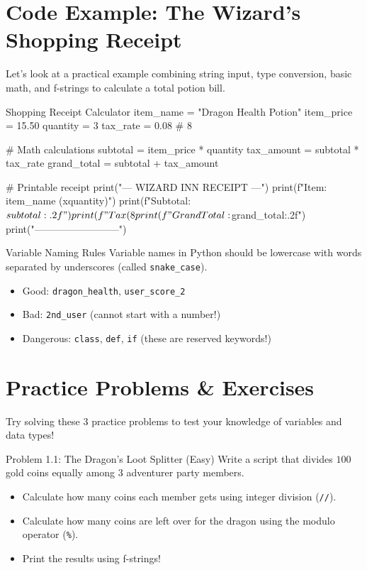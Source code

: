 \section{Code Example: The Wizard's Shopping Receipt}

Let's look at a practical example combining string input, type conversion, basic math, and f-strings to calculate a total potion bill.

\begin{pycode}{Shopping Receipt Calculator}
item_name = "Dragon Health Potion"
item_price = 15.50
quantity = 3
tax_rate = 0.08  # 8%

# Math calculations
subtotal = item_price * quantity
tax_amount = subtotal * tax_rate
grand_total = subtotal + tax_amount

# Printable receipt
print("--- WIZARD INN RECEIPT ---")
print(f"Item: {item_name} (x{quantity})")
print(f"Subtotal: ${subtotal:.2f}")
print(f"Tax (8%
print(f"Grand Total: ${grand_total:.2f}")
print("--------------------------")
\end{pycode}

\begin{snakesnack}{Variable Naming Rules}
Variable names in Python should be lowercase with words separated by underscores (called \texttt{snake\_case}). 
\begin{itemize}
    \item Good: \texttt{dragon\_health}, \texttt{user\_score\_2}
    \item Bad: \texttt{2nd\_user} (cannot start with a number!)
    \item Dangerous: \texttt{class}, \texttt{def}, \texttt{if} (these are reserved keywords!)
\end{itemize}
\end{snakesnack}

\section{Practice Problems \& Exercises}

Try solving these 3 practice problems to test your knowledge of variables and data types!

\begin{snakelab}{Problem 1.1: The Dragon's Loot Splitter (Easy)}
Write a script that divides $100$ gold coins equally among $3$ adventurer party members. 
\begin{itemize}
    \item Calculate how many coins each member gets using integer division (\texttt{//}).
    \item Calculate how many coins are left over for the dragon using the modulo operator (\texttt{\%}).
    \item Print the results using f-strings!
\end{itemize}
\end{snakelab}

